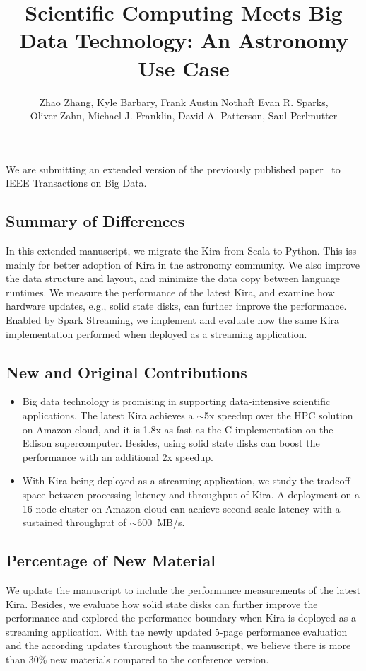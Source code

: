 \documentclass[10pt,a4paper]{article}
\title{Scientific Computing Meets Big Data Technology: An Astronomy Use Case}
\author{Zhao Zhang, Kyle Barbary, Frank Austin Nothaft Evan R. Sparks, \\Oliver Zahn, Michael J. Franklin, David A. Patterson, Saul Perlmutter}
\begin{document}
\maketitle
\noindent We are submitting an extended version of the previously published paper~\cite{lamport94} to IEEE Transactions on Big Data.
\subsection*{Summary of Differences}
In this extended manuscript, we migrate the Kira from Scala to Python. 
This iss mainly for better adoption of Kira in the astronomy community. 
We also improve the data structure and layout, and minimize the data copy between language runtimes.
We measure the performance of the latest Kira, and examine how hardware updates, e.g., solid state disks, can further improve the performance.
Enabled by Spark Streaming, we implement and evaluate how the same Kira implementation performed when deployed
as a streaming application. 

\subsection*{New and Original Contributions}
\begin{itemize}
\item{} Big data technology is promising in supporting data-intensive scientific applications.
The latest Kira achieves a $\sim$5x speedup over the HPC solution on Amazon cloud, 
and it is 1.8x as fast as the C implementation on the Edison supercomputer. 
Besides, using solid state disks can boost the performance with an additional 2x speedup.
\item{} With Kira being deployed as a streaming application, we study the tradeoff space between processing latency and throughput of Kira.
A deployment on a 16-node cluster on Amazon cloud can achieve second-scale latency with a sustained throughput of $\sim$600~MB/s.
\end{itemize}

\subsection*{Percentage of New Material}
We update the manuscript to include the performance measurements of the latest Kira. 
Besides, we evaluate how solid state disks can further improve the performance and explored the performance boundary when Kira
is deployed as a streaming application.
With the newly updated 5-page performance evaluation and the according updates throughout the manuscript, we believe there is more
than 30\% new materials compared to the conference version.
\end{document}
